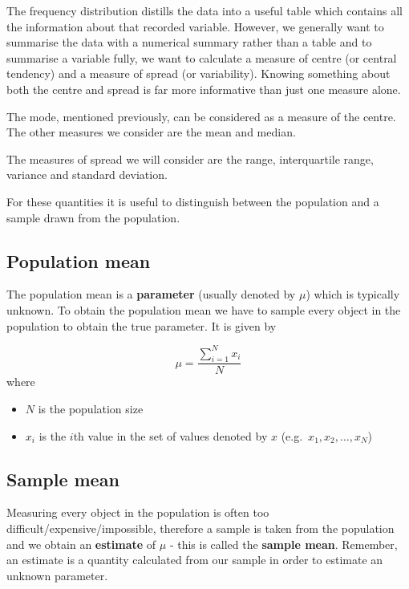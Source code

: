 \documentclass[
  oneside]{krantz}
\begin{document}
The frequency distribution distills the data into a useful table which contains all the information about that recorded variable. However, we generally want to summarise the data with a numerical summary rather than a table and to summarise a variable fully, we want to calculate a measure of centre (or central tendency) and a measure of spread (or variability). Knowing something about both the centre and spread is far more informative than just one measure alone.

The mode, mentioned previously, can be considered as a measure of the centre. The other measures we consider are the mean and median.

The measures of spread we will consider are the range, interquartile range, variance and standard deviation.

For these quantities it is useful to distinguish between the population and a sample drawn from the population.

\hypertarget{population-mean}{%
\subsection{Population mean}\label{population-mean}}

The population mean is a \textbf{parameter} (usually denoted by \(\mu\)) which is typically unknown. To obtain the population mean we have to sample every object in the population to obtain the true parameter. It is given by

\[\mu=\frac{\sum_{i=1}^{N} x_i}{N}\]
where

\begin{itemize}
\item
  \(N\) is the population size
\item
  \(x_i\) is the \(i\)th value in the set of values denoted by \(x\) (e.g.~\(x_1, x_2, \ldots ,x_N\))
\end{itemize}

\hypertarget{sample-mean}{%
\subsection{Sample mean}\label{sample-mean}}

Measuring every object in the population is often too difficult/expensive/impossible, therefore a sample is taken from the population and we obtain an \textbf{estimate} of \(\mu\) - this is called the \textbf{sample mean}. Remember, an estimate is a quantity calculated from our sample in order to estimate an unknown parameter.
\end{document}
